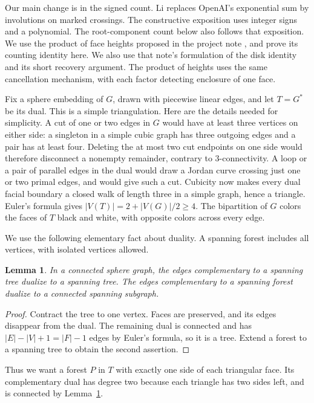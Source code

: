\documentclass[10pt,a4paper]{amsart}
\newtheorem{lemma}[theorem]{Lemma}
\theoremstyle{remark}
\begin{document}
Our main change is in the signed count. Li \cite{li2026} replaces OpenAI's exponential sum by involutions on marked crossings. The constructive exposition \cite{constructive2026} uses integer signs and a polynomial. The root-component count below also follows that exposition. We use the product of face heights proposed in the project note \cite[Sections 1--3]{heightnote}, and prove its counting identity here. We also use that note's formulation of the disk identity and its short recovery argument. The product of heights uses the same cancellation mechanism, with each factor detecting enclosure of one face.

Fix a sphere embedding of $G$, drawn with piecewise linear edges, and let $T=G^*$ be its dual. This is a simple triangulation. Here are the details needed for simplicity. A cut of one or two edges in $G$ would have at least three vertices on either side: a singleton in a simple cubic graph has three outgoing edges and a pair has at least four. Deleting the at most two cut endpoints on one side would therefore disconnect a nonempty remainder, contrary to 3-connectivity. A loop or a pair of parallel edges in the dual would draw a Jordan curve crossing just one or two primal edges, and would give such a cut. Cubicity now makes every dual facial boundary a closed walk of length three in a simple graph, hence a triangle. Euler's formula gives $|V(T)|=2+|V(G)|/2\geq4$. The bipartition of $G$ colors the faces of $T$ black and white, with opposite colors across every edge.

We use the following elementary fact about duality. A spanning forest includes all vertices, with isolated vertices allowed.
\begin{lemma}\label{lem:duality}
In a connected sphere graph, the edges complementary to a spanning tree dualize to a spanning tree. The edges complementary to a spanning forest dualize to a connected spanning subgraph.
\end{lemma}
\begin{proof}
Contract the tree to one vertex. Faces are preserved, and its edges disappear from the dual. The remaining dual is connected and has $|E|-|V|+1=|F|-1$ edges by Euler's formula, so it is a tree. Extend a forest to a spanning tree to obtain the second assertion.
\end{proof}
Thus we want a forest $P$ in $T$ with exactly one side of each triangular face. Its complementary dual has degree two because each triangle has two sides left, and is connected by Lemma~\ref{lem:duality}.
\end{document}
